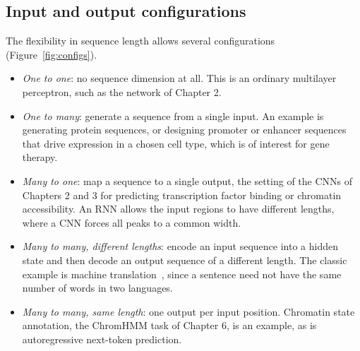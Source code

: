 \subsection{Input and output configurations}

The flexibility in sequence length allows several configurations (Figure~\ref{fig:configs}).
\begin{itemize}
  \item \emph{One to one}: no sequence dimension at all. This is an ordinary multilayer perceptron, such as the network of Chapter 2.
  \item \emph{One to many}: generate a sequence from a single input. An example is generating protein sequences, or designing promoter or enhancer sequences that drive expression in a chosen cell type, which is of interest for gene therapy.
  \item \emph{Many to one}: map a sequence to a single output, the setting of the CNNs of Chapters 2 and 3 for predicting transcription factor binding or chromatin accessibility. An RNN allows the input regions to have different lengths, where a CNN forces all peaks to a common width.
  \item \emph{Many to many, different lengths}: encode an input sequence into a hidden state and then decode an output sequence of a different length. The classic example is machine translation~\citep{sutskever2014}, since a sentence need not have the same number of words in two languages.
  \item \emph{Many to many, same length}: one output per input position. Chromatin state annotation, the ChromHMM task of Chapter 6, is an example, as is autoregressive next-token prediction.
\end{itemize}

